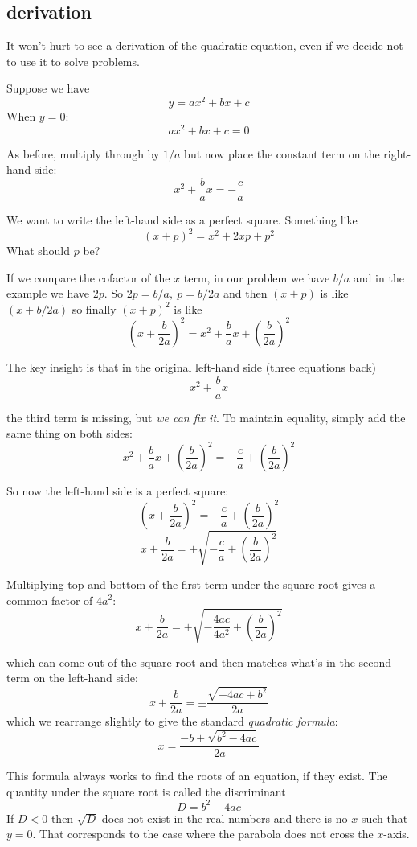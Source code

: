 \documentclass[11pt, oneside]{article}
\begin{document}
\subsection*{derivation}

It won't hurt to see a derivation of the quadratic equation, even if we decide not to use it to solve problems.

Suppose we have
\[ y = ax^2 + bx + c \]
When $y = 0$:
\[ ax^2 + bx + c = 0 \]

As before, multiply through by $1/a$ but now place the constant term on the right-hand side:
\[ x^2 + \frac{b}{a} x = - \frac{c}{a} \]

We want to write the left-hand side as a perfect square.  Something like
\[ (x + p)^2 = x^2 + 2xp + p^2 \]
What should $p$ be?

If we compare the cofactor of the $x$ term, in our problem we have $b/a$ and in the example we have $2p$.  So $2p = b/a,  \ p = b/2a$ and then $(x + p)$ is like $(x + b/2a)$ so finally $(x + p)^2$ is like
\[ (x + \frac{b}{2a})^2 = x^2 + \frac{b}{a}x + (\frac{b}{2a})^2 \]

The key insight is that in the original left-hand side (three equations back)
\[ x^2 + \frac{b}{a} x \]

the third term is missing, but \emph{we can fix it}.  To maintain equality, simply add the same thing on both sides:
\[ x^2 + \frac{b}{a} x + (\frac{b}{2a})^2  = -\frac{c}{a} + (\frac{b}{2a})^2 \]

So now the left-hand side is a perfect square:
\[ (x + \frac{b}{2a})^2 = -\frac{c}{a} + (\frac{b}{2a})^2 \]
\[ x + \frac{b}{2a} = \pm \sqrt{-\frac{c}{a} + (\frac{b}{2a})^2} \]

Multiplying top and bottom of the first term under the square root gives a common factor of $4a^2$:
\[ x + \frac{b}{2a} = \pm \sqrt{-\frac{4ac}{4a^2} + (\frac{b}{2a})^2} \]

which can come out of the square root and then matches what's in the second term on the left-hand side:
\[ x + \frac{b}{2a} = \pm \frac{\sqrt{-4ac + b^2}}{2a} \]
which we rearrange slightly to give the standard \emph{quadratic formula}:
\[ x = \frac{-b \pm \sqrt{b^2 - 4ac}}{2a} \]

This formula always works to find the roots of an equation, if they exist.  The quantity under the square root is called the discriminant
\[ D = b^2 - 4ac \]
If $D < 0$ then $\sqrt{D}$ does not exist in the real numbers and there is no $x$ such that $y = 0$.  That corresponds to the case where the parabola does not cross the $x$-axis.
\end{document}
